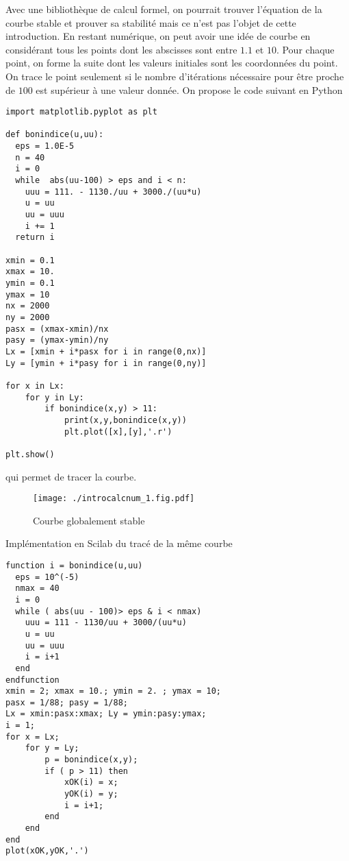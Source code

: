 Avec une bibliothèque de calcul formel, on pourrait trouver l'équation de la courbe stable et prouver sa stabilité mais ce n'est pas l'objet de cette introduction. En restant numérique, on peut avoir une idée de courbe en considérant tous les points dont les abscisses sont entre $1.1$ et $10$. Pour chaque point, on forme la suite dont les valeurs initiales sont les coordonnées du point. On trace le point seulement si le nombre d'itérations nécessaire pour être proche de $100$ est supérieur à une valeur donnée. On propose le code suivant en Python
\begin{verbatim}
import matplotlib.pyplot as plt

def bonindice(u,uu):
  eps = 1.0E-5
  n = 40
  i = 0
  while  abs(uu-100) > eps and i < n:
    uuu = 111. - 1130./uu + 3000./(uu*u)
    u = uu
    uu = uuu
    i += 1
  return i

xmin = 0.1
xmax = 10.
ymin = 0.1
ymax = 10
nx = 2000
ny = 2000
pasx = (xmax-xmin)/nx
pasy = (ymax-ymin)/ny
Lx = [xmin + i*pasx for i in range(0,nx)]
Ly = [ymin + i*pasy for i in range(0,ny)]

for x in Lx:
    for y in Ly:
        if bonindice(x,y) > 11:
            print(x,y,bonindice(x,y))
            plt.plot([x],[y],'.r')

plt.show()  
\end{verbatim}
qui permet de tracer la courbe.
\begin{figure}[h]
  \centering
  \texttt{[image: ./introcalcnum\_1.fig.pdf]}
  \caption{Courbe globalement stable}
  \label{fig:introcalcnum_1}
\end{figure}
Implémentation en Scilab du tracé de la même courbe
\begin{verbatim}
function i = bonindice(u,uu)
  eps = 10^(-5)
  nmax = 40
  i = 0
  while ( abs(uu - 100)> eps & i < nmax)
    uuu = 111 - 1130/uu + 3000/(uu*u)
    u = uu
    uu = uuu
    i = i+1
  end
endfunction
xmin = 2; xmax = 10.; ymin = 2. ; ymax = 10;
pasx = 1/88; pasy = 1/88;
Lx = xmin:pasx:xmax; Ly = ymin:pasy:ymax;
i = 1;
for x = Lx;
    for y = Ly;
        p = bonindice(x,y);
        if ( p > 11) then
            xOK(i) = x;
            yOK(i) = y;
            i = i+1;
        end
    end
end
plot(xOK,yOK,'.')
\end{verbatim}
